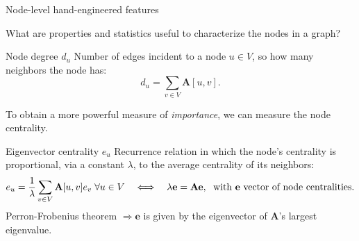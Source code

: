 \documentclass[10pt, aspectratio=169, compress, protectframetitle, handout]{beamer}
\begin{document}
\begin{frame}{Node-level hand-engineered features}

     What are properties and statistics useful to characterize the nodes in a graph?

    \begin{block}{\alert{Node degree $d_u$}}
        Number of edges incident to a node $u \in V$, so how many neighbors the node has:
        \vspace{-0.2cm}
        \begin{equation}
            d_u = \sum_{v \in V} \mathbf A[u, v].
            \label{eq:degree}
        \end{equation}
    \end{block}
    
    To obtain a more powerful measure of \emph{importance}, we can measure the \alert{node centrality}.
    
    \begin{block}{\alert{Eigenvector centrality $e_u$}}
        Recurrence relation in which the node's centrality is proportional, via a constant $\lambda$, to the average centrality of its neighbors:
        \vspace{-0.2cm}
        \begin{equation}
            e_u = \frac1\lambda \sum_{v \in V} \mathbf A[u, v] e_v \; \forall u \in V \quad \Longleftrightarrow \quad \lambda \mathbf e = \mathbf A \mathbf e, \; \text{ with }\mathbf e \text{ vector of node centralities}.
            \label{eq:eigencentr}
            \vspace{-0.2cm}
        \end{equation}
        Perron-Frobenius theorem $\Longrightarrow \mathbf e$ is given by the eigenvector of $\mathbf A$'s largest eigenvalue.
    \end{block}
    
\end{frame}
\end{document}
